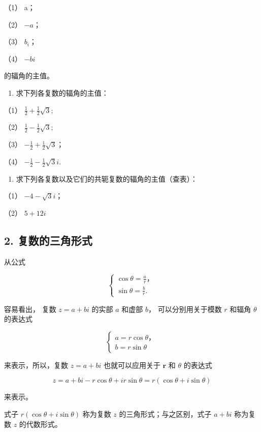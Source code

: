 （1） a；

（2） \(-a\)；

（3） \(b_{i}\)；

（4） \(-bi\)

的辐角的主值。

\begin{enumerate}[start=2]
\item
  求下列各复数的辐角的主值：
\end{enumerate}

（1） \(\frac{1}{2} + \frac{1}{2}\sqrt{3};\)

（2） \(\frac{1}{2} - \frac{1}{2}\sqrt{3};\)

（3） \(-\frac{1}{2} + \frac{1}{2}\sqrt{3}\)；

（4） \(-\frac{1}{2} - \frac{1}{2}\sqrt{3}i.\)

\begin{enumerate}[start=3]
\item
  求下列各复数以及它们的共轭复数的辐角的主值（查表）：
\end{enumerate}

（1） \(-4 - \sqrt{3} i\)；

（2） \(5+12i\)

\subsection{2. 复数的三角形式}

从公式

\[
\left\{ \begin{array}{l} \cos \theta = \frac {a}{r}\text{，} \\ \sin \theta = \frac {b}{r}. \end{array} \right.
\]

容易看出， 复数 \(z = a + bi\) 的实部 \(a\) 和虚部 \(b\)，
可以分别用关于模数 \(r\) 和辐角 \(\theta\) 的表达式

\[
\left\{ \begin{array}{l} a = r \cos \theta \text{，} \\ b = r \sin \theta \end{array} \right.
\]

来表示，所以，复数 \(z = a + bi\) 也就可以应用关于 \(\pmb{r}\) 和
\(\theta\) 的表达式

\[
\boxed {z = a + b i - r \cos \theta + i r \sin \theta = r (\cos \theta + i \sin \theta)}
\]

来表示。

式子 \(r(\cos \theta + i\sin \theta)\) 称为复数 \(z\)
的三角形式；与之区别，式子 \(a + bi\) 称为复数 \(z\) 的代数形式。

